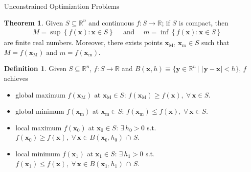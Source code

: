 \documentclass[10pt]{beamer}
\newcommand{\ds}{\displaystyle}
\theoremstyle{definition}
\newtheorem*{dfn}{Definition}
\newtheorem*{thm}{Theorem}
\newcommand{\vx}{\mathbf{x}}
\newcommand{\vy}{\mathbf{y}}
\begin{document}
\begin{frame}{Unconstrained Optimization Problems}

\begin{thm}%
  Given $\ds S\subseteq\mathbb{R}^n$ and continuous $f: S\to\mathbb{R}$; if $S$ is compact, then  
  \begin{align*}
    M = \sup\left\{f(\vx): \vx\in S\right\}\quad\text{ and }\quad m = \inf\left\{f(\vx): \vx\in S\right\}
  \end{align*}
  are finite real numbers. Moreover, there exists points $\vx_\text{M}$, $\vx_\text{m}\in S$ such that $M = f(\vx_\text{M})$ and $m = f(\vx_\text{m})$.
\end{thm}

\begin{dfn}
  Given $\ds S\subseteq\mathbb{R}^n$, $\ds f:S\to\mathbb{R}$ and $\ds B(\vx, h)\equiv\{\vy\in\mathbb{R}^n\;|\;|\vy - \vx| < h\}$, $f$ achieves 
  \begin{itemize}
    \item global maximum $\ds f(\vx_\text{M})$ at $\ds\vx_\text{M}\in S$: $\ds f(\vx_\text{M})\geqslant f(\vx),\;\forall\,\vx\in S$. 
    \item global minimum $\ds f(\vx_\text{m})$ at $\ds \vx_\text{m}\in S$: $\ds f(\vx_\text{m})\leqslant f(\vx),\;\forall\,\vx\in S$. 
    \item local maximum $\ds f(\vx_0)$ at $\ds\vx_0\in S$: $\ds\exists\,h_0 > 0$ s.t. $\ds f(\vx_0)\geqslant f(\vx),\;\forall\,\vx\in B(\vx_0, h_0)\,\cap\,S$. 
    \item local minimum $\ds f(\vx_1)$ at $\ds\vx_1\in S$: $\ds\exists\,h_1 > 0$ s.t. $\ds f(\vx_1)\leqslant f(\vx),\;\forall\,\vx\in B(\vx_1, h_1)\,\cap\,S$. 
  \end{itemize}
\end{dfn}
\end{frame}
\end{document}
